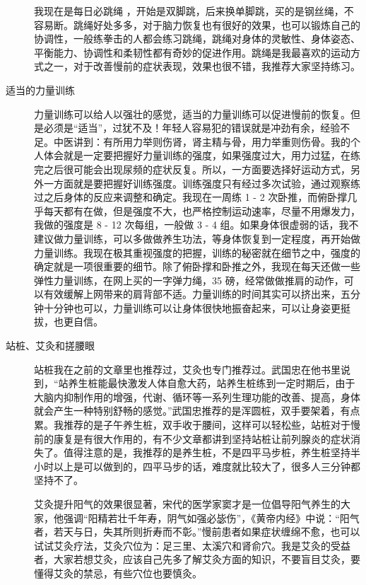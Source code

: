 \documentclass{ctexart}
\begin{document}
\begin{description}
    我现在是每日必跳绳 ，开始是双脚跳，后来换单脚跳，买的是钢丝绳，不容易断。跳绳好处多多，对于脑力恢复也有很好的效果，也可以锻炼自己的协调性，一般练拳击的人都会练习跳绳，跳绳对身体的灵敏性、身体姿态、平衡能力、协调性和柔韧性都有奇妙的促进作用。跳绳是我最喜欢的运动方式之一，对于改善慢前的症状表现，效果也很不错，我推荐大家坚持练习。
    \item[适当的力量训练] 力量训练可以给人以强壮的感觉，适当的力量训练可以促进慢前的恢复。但是必须是“适当”，过犹不及！年轻人容易犯的错误就是冲劲有余，经验不足。中医讲到：有所用力举则伤肾，肾主精与骨，用力举重则伤骨。我的个人体会就是一定要把握好力量训练的强度，如果强度过大，用力过猛，在练完之后很可能会出现尿频的症状反复。所以，一方面要选择好运动方式，另外一方面就是要把握好训练强度。训练强度只有经过多次试验，通过观察练过之后身体的反应来调整和确定。我现在一周练 1 - 2 次卧推，而俯卧撑几乎每天都有在做，但是强度不大，也严格控制运动速率，尽量不用爆发力，我做的强度是 8 - 12 次每组，一般做 3 - 4 组。如果身体很虚弱的话，我不建议做力量训练，可以多做做养生功法，等身体恢复到一定程度，再开始做力量训练。我现在极其重视强度的把握，训练的秘密就在细节之中，强度的确定就是一项很重要的细节。除了俯卧撑和卧推之外，我现在每天还做一些弹性力量训练，在网上买的一字弹力绳，35 磅，经常做做推肩的动作，可以有效缓解上网带来的肩背部不适。力量训练的时间其实可以挤出来，五分钟十分钟也可以，力量训练可以让身体很快地振奋起来，可以让身姿更挺拔，也更自信。
    \item[站桩、艾灸和搓腰眼] 站桩我在之前的文章里也推荐过，艾灸也专门推荐过。武国忠在他书里说到，“站养生桩能最快激发人体自愈大药，站养生桩练到一定时期后，由于大脑内抑制作用的增强，代谢、循环等一系列生理功能的改善、提高，身体就会产生一种特别舒畅的感觉。”武国忠推荐的是浑圆桩，双手要架着，有点累。我推荐的是子午养生桩，双手收于腰间，这样可以轻松些，站桩对于慢前的康复是有很大作用的，有不少文章都讲到坚持站桩让前列腺炎的症状消失了。值得注意的是，我推荐的是养生桩，不是四平马步桩，养生桩坚持半小时以上是可以做到的，四平马步的话，难度就比较大了，很多人三分钟都坚持不了。

    艾灸提升阳气的效果很显著，宋代的医学家窦才是一位倡导阳气养生的大家，他强调“阳精若壮千年寿，阴气如强必毖伤”，《黄帝内经》中说：“阳气者，若天与日，失其所则折寿而不彰。”慢前患者如果症状缠绵不愈，也可以试试艾灸疗法，艾灸穴位为：足三里、太溪穴和肾俞穴。我是艾灸的受益者，大家若想艾灸，应该自己先多了解艾灸方面的知识，不要盲目艾灸，要懂得艾灸的禁忌，有些穴位也要慎灸。


\end{description}
\end{document}
